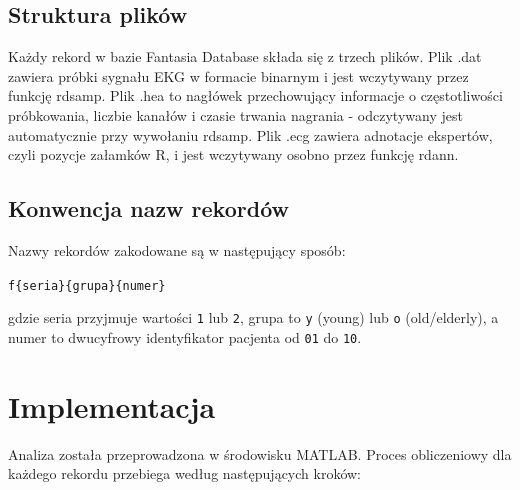 \documentclass[a4paper,12pt]{article}
\begin{document}
\subsection{Struktura plików}

Każdy rekord w bazie Fantasia Database składa się z trzech plików. Plik .dat zawiera próbki sygnału EKG w formacie binarnym i jest wczytywany przez funkcję rdsamp. Plik .hea to nagłówek przechowujący informacje o częstotliwości próbkowania, liczbie kanałów i czasie trwania nagrania - odczytywany jest automatycznie przy wywołaniu rdsamp. Plik .ecg zawiera adnotacje ekspertów, czyli pozycje załamków R, i jest wczytywany osobno przez funkcję rdann.

\subsection{Konwencja nazw rekordów}

Nazwy rekordów zakodowane są w następujący sposób:

\begin{center}
\texttt{f\{seria\}\{grupa\}\{numer\}}
\end{center}

gdzie seria przyjmuje wartości \texttt{1} lub \texttt{2}, grupa to \texttt{y} (young) lub \texttt{o} (old/elderly), a numer to dwucyfrowy identyfikator pacjenta od \texttt{01} do \texttt{10}.


\section{Implementacja}

Analiza została przeprowadzona w środowisku MATLAB. Proces obliczeniowy dla każdego rekordu przebiega według następujących kroków:
\end{document}
